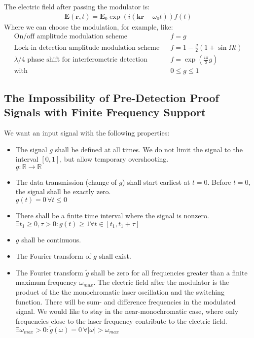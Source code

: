 \documentclass[12pt,a4paper,twoside,openright,BCOR10mm,headsepline,titlepage,abstracton,chapterprefix,final]{scrreprt}
\newcommand\Vector[1]{{\mathbf{#1}}}
\newcommand\Location{\Vector{r}}
\newcommand\wavenumber{k}
\newcommand\Wavevector{\Vector{\wavenumber}}
\newcommand\scalarEfield{E}
\newcommand\Efield{\Vector{\scalarEfield}}
\begin{document}
The electric field after passing the modulator is:
\begin{eqnarray}
 \Efield(\Location, t) = \Efield_0 \exp (i (\Wavevector \Location - \omega_0 t)) f(t)
\end{eqnarray}
Where we can choose the modulation, for example, like:
\begin{eqnarray}
 \textrm{On/off amplitude modulation scheme}&& f = g\\
 \textrm{Lock-in detection amplitude modulation scheme}&& f = 1 - \frac{g}{2} (1 + \sin{\Omega t}) \\
 \textrm{$\lambda/4$ phase shift for interferometric detection}&& f = \exp\left( \frac{i \pi}{2} g \right) \\
 \textrm{with}&& 0 \leq g \leq 1
\end{eqnarray}


\subsection{The Impossibility of Pre-Detection Proof Signals with Finite Frequency Support}
We want an input signal with the following properties:
\begin{itemize}
 \item The signal $g$ shall be defined at all times.
       We do not limit the signal to the interval $[0,1]$, but allow temporary overshooting.\\
       $g:\mathbb{R}\rightarrow \mathbb{R}$
 \item The data transmission (change of $g$) shall start earliest at $t=0$.
       Before $t=0$, the signal shall be exactly zero.\\
       $g(t)=0 \,\forall t\leq0$
 \item There shall be a finite time interval where the signal is nonzero.\\
       $\exists t_1\geq0, \tau>0: g(t) \geq 1 \forall t \in [t_1, t_1+\tau]$
 \item $g$ shall be continuous.
 \item The Fourier transform of $g$ shall exist.
 \item The Fourier transform $\tilde{g}$ shall be zero 
       for all frequencies greater than a finite maximum frequency $\omega_{max}$.
       The electric field after the modulator is 
       the product of the the monochromatic laser oscillation and the switching function.
       There will be sum- and difference frequencies in the modulated signal.
       We would like to stay in the near-monochromatic case, 
       where only frequencies close to the laser frequency contribute to the electric field.\\
       $\exists \omega_{max}>0 : \tilde{g}(\omega) = 0 \,\forall |\omega| > \omega_{max}$
\end{itemize}
\end{document}
